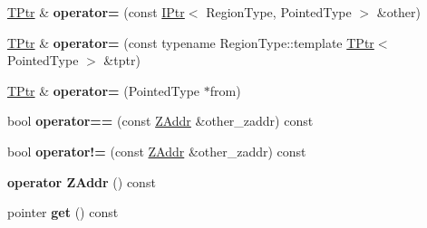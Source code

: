 \begin{DoxyCompactItemize}
\item 
\hyperlink{classalps_1_1BaseRelativePointer_1_1TPtr}{T\+Ptr} \& {\bfseries operator=} (const \hyperlink{classalps_1_1BaseRelativePointer_1_1IPtr}{I\+Ptr}$<$ Region\+Type, Pointed\+Type $>$ \&other)\hypertarget{classalps_1_1BaseRelativePointer_1_1TPtr_a868c62ae1ca78448451fffaace02a6d2}{}\label{classalps_1_1BaseRelativePointer_1_1TPtr_a868c62ae1ca78448451fffaace02a6d2}

\item 
\hyperlink{classalps_1_1BaseRelativePointer_1_1TPtr}{T\+Ptr} \& {\bfseries operator=} (const typename Region\+Type\+::template \hyperlink{classalps_1_1BaseRelativePointer_1_1TPtr}{T\+Ptr}$<$ Pointed\+Type $>$ \&tptr)\hypertarget{classalps_1_1BaseRelativePointer_1_1TPtr_a915e02d4d8de6f209e00ae0afb562ae5}{}\label{classalps_1_1BaseRelativePointer_1_1TPtr_a915e02d4d8de6f209e00ae0afb562ae5}

\item 
\hyperlink{classalps_1_1BaseRelativePointer_1_1TPtr}{T\+Ptr} \& {\bfseries operator=} (Pointed\+Type $\ast$from)\hypertarget{classalps_1_1BaseRelativePointer_1_1TPtr_a2e95d9beb43202b8152679bf66c4eb48}{}\label{classalps_1_1BaseRelativePointer_1_1TPtr_a2e95d9beb43202b8152679bf66c4eb48}

\item 
bool {\bfseries operator==} (const \hyperlink{structalps_1_1ZAddr}{Z\+Addr} \&other\+\_\+zaddr) const \hypertarget{classalps_1_1BaseRelativePointer_1_1TPtr_ab1c67178ed0369619c073bae4f19b4c3}{}\label{classalps_1_1BaseRelativePointer_1_1TPtr_ab1c67178ed0369619c073bae4f19b4c3}

\item 
bool {\bfseries operator!=} (const \hyperlink{structalps_1_1ZAddr}{Z\+Addr} \&other\+\_\+zaddr) const \hypertarget{classalps_1_1BaseRelativePointer_1_1TPtr_a4ada056e052fd9091728502b88a58a51}{}\label{classalps_1_1BaseRelativePointer_1_1TPtr_a4ada056e052fd9091728502b88a58a51}

\item 
{\bfseries operator Z\+Addr} () const \hypertarget{classalps_1_1BaseRelativePointer_1_1TPtr_abcdb8e7edc740d33431e61d9037ab876}{}\label{classalps_1_1BaseRelativePointer_1_1TPtr_abcdb8e7edc740d33431e61d9037ab876}

\item 
pointer {\bfseries get} () const \hypertarget{classalps_1_1BaseRelativePointer_1_1TPtr_a7d9dfb9e65407fb638675360ec4ca575}{}\label{classalps_1_1BaseRelativePointer_1_1TPtr_a7d9dfb9e65407fb638675360ec4ca575}


\end{DoxyCompactItemize}
